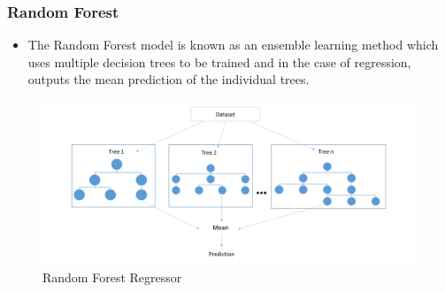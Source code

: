\begin{frame}
    \frametitle{Random Forest}
    \begin{itemize}
    \item The Random Forest model is known as an ensemble learning method which uses multiple decision trees to be trained and in the case of regression, outputs the mean prediction of the individual trees. 
    \end{itemize}
    \begin{figure}[H]
        \centering
        \includegraphics[scale=0.15]{graphs/RandomForest.png}
        \caption{Random Forest Regressor}
        \label{fig:N20}
    \end{figure}
\end{frame}
    
